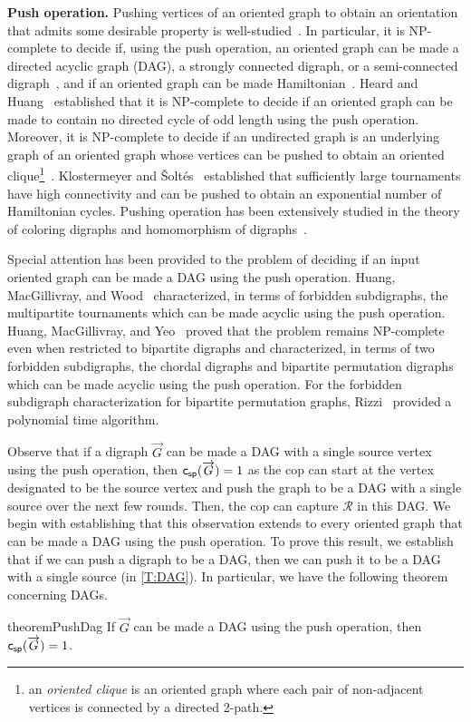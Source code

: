 \documentclass[a4paper,12pt]{amsart}
\newcommand{\R}{\mathcal{R}}
\newcommand{\csp}[1]{{\sf c_{sp}}(\overrightarrow{#1})}
\begin{document}
\smallskip
\noindent\textbf{Push operation.} Pushing vertices of an oriented graph to obtain an orientation that admits some desirable property is well-studied~\cite{klostermeyer1}. 
In particular, it is NP-complete to decide if, using the push operation, an oriented graph can be made a directed acyclic graph (DAG), a strongly connected digraph, or a semi-connected digraph~\cite{klostermeyer1}, and  if an oriented graph can be made Hamiltonian~\cite{klostermeyer2}.  Heard and Huang~\cite{heard2009kernel} established that it is NP-complete to decide if an oriented graph can be made to contain no directed cycle of odd length using the push operation. Moreover, it is NP-complete to decide if an undirected graph is an underlying graph of an oriented graph whose vertices can be pushed to obtain an oriented clique\footnote{an \textit{oriented clique} is an oriented graph where each pair of non-adjacent vertices is connected by a directed 2-path.}~\cite{bensmail2017oriented}. Klostermeyer and {\v{S}}olt{\'e}s~\cite{klostermeyer2000extremal} established that sufficiently large tournaments have high connectivity and can be pushed to obtain an exponential number of Hamiltonian cycles. Pushing operation has been extensively studied in the theory of coloring digraphs and homomorphism of digraphs~\cite{sen2017homomorphisms,bensmail2021pushable,bensmail2023pushable}.  



Special attention has been provided to the problem of deciding if  an input oriented graph can be made a DAG using the push operation. Huang, MacGillivray, and Wood~\cite{huang2001pushing} characterized, in terms of forbidden subdigraphs, the multipartite tournaments which can be made acyclic using the push operation. Huang, MacGillivray, and Yeo~\cite{huang2002pushing} proved that the problem remains NP-complete even when restricted to bipartite digraphs and characterized, in terms of two forbidden subdigraphs, the chordal digraphs and bipartite permutation digraphs which can be made acyclic using the push operation. For the forbidden subdigraph characterization for bipartite permutation graphs, Rizzi~\cite{rizzi2006acyclically} provided a polynomial time algorithm. 

Observe that if a digraph $\overrightarrow{G}$ can be made a DAG with a single source vertex  using the push operation, then $\csp{G} = 1$ as the cop can start at the vertex designated to be the source vertex and push the graph to be a DAG with a single source over the next few rounds. Then, the cop can capture $\R$ in this DAG. We begin with establishing that this observation extends to every oriented graph that can be made a DAG using the push operation. To prove this result, we establish that if we can push a digraph to be a DAG, then we can push it to be a DAG with a single source (in \cref{T:DAG}). In particular, we have the following theorem concerning DAGs. 
\begin{restatable}{theorem}{PushDag}\label{C:DAG}
    If $\overrightarrow{G}$ can be made a DAG using the push operation, then $\csp{G} = 1$.
\end{restatable}
\end{document}
